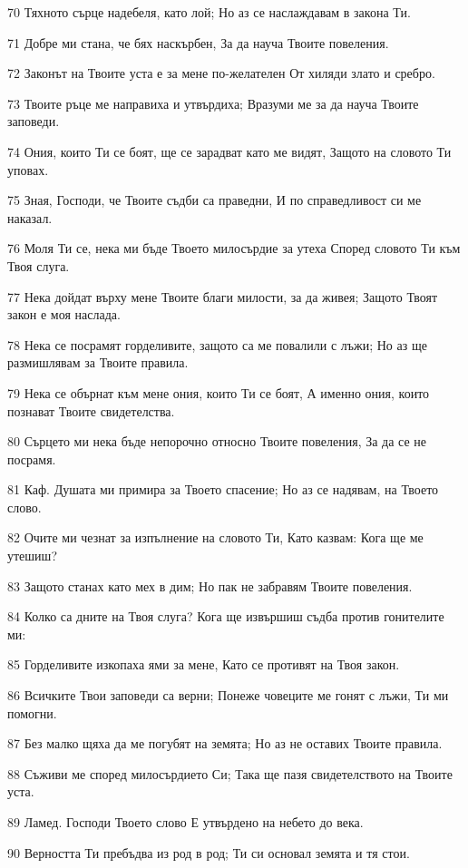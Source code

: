 \par 70 Тяхното сърце надебеля, като лой; Но аз се наслаждавам в закона Ти.
\par 71 Добре ми стана, че бях наскърбен, За да науча Твоите повеления.
\par 72 Законът на Твоите уста е за мене по-желателен От хиляди злато и сребро.
\par 73 Твоите ръце ме направиха и утвърдиха; Вразуми ме за да науча Твоите заповеди.
\par 74 Ония, които Ти се боят, ще се зарадват като ме видят, Защото на словото Ти уповах.
\par 75 Зная, Господи, че Твоите съдби са праведни, И по справедливост си ме наказал.
\par 76 Моля Ти се, нека ми бъде Твоето милосърдие за утеха Според словото Ти към Твоя слуга.
\par 77 Нека дойдат върху мене Твоите благи милости, за да живея; Защото Твоят закон е моя наслада.
\par 78 Нека се посрамят горделивите, защото са ме повалили с лъжи; Но аз ще размишлявам за Твоите правила.
\par 79 Нека се обърнат към мене ония, които Ти се боят, А именно ония, които познават Твоите свидетелства.
\par 80 Сърцето ми нека бъде непорочно относно Твоите повеления, За да се не посрамя.
\par 81 Каф. Душата ми примира за Твоето спасение; Но аз се надявам, на Твоето слово.
\par 82 Очите ми чезнат за изпълнение на словото Ти, Като казвам: Кога ще ме утешиш?
\par 83 Защото станах като мех в дим; Но пак не забравям Твоите повеления.
\par 84 Колко са дните на Твоя слуга? Кога ще извършиш съдба против гонителите ми:
\par 85 Горделивите изкопаха ями за мене, Като се противят на Твоя закон.
\par 86 Всичките Твои заповеди са верни; Понеже човеците ме гонят с лъжи, Ти ми помогни.
\par 87 Без малко щяха да ме погубят на земята; Но аз не оставих Твоите правила.
\par 88 Съживи ме според милосърдието Си; Така ще пазя свидетелството на Твоите уста.
\par 89 Ламед. Господи Твоето слово Е утвърдено на небето до века.
\par 90 Верността Ти пребъдва из род в род; Ти си основал земята и тя стои.
